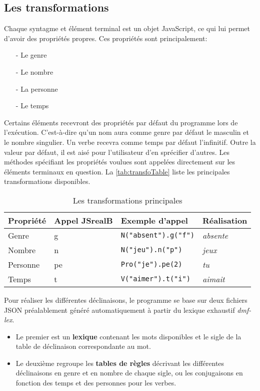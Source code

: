 \documentclass[11pt]{article} %
\newcommand{\system}[1]{\textsf{#1}}
\newcommand{\JSB}{\system{JSrealB}}
\newcommand{\real}[1]{\emph{#1}}
\begin{document}
\pagebreak{}
\subsection{Les transformations}

Chaque syntagme et élément terminal est un objet JavaScript, ce qui
lui permet d'avoir des propriétés propres. Ces propriétés sont principalement:
\begin{itemize}
\item[-] Le genre
\item[-] Le nombre
\item[-] La personne
\item[-] Le temps
\end{itemize}
Certains éléments recevront des propriétés par défaut du programme
lors de l'exécution. C'est-à-dire qu'un nom aura comme genre par défaut
le masculin et le nombre singulier. Un verbe recevra comme temps par
défaut l'infinitif. Outre la valeur par défaut, il est aisé pour
l'utilisateur d'en sprécifier d'autres. Les méthodes spécifiant les
propriétés voulues sont appelées directement sur les éléments terminaux
en question. La \autoref{tab:transfoTable} liste les principales transformations
disponibles.

\begin{table}[h]
\centering
\caption{Les transformations principales}
\label{tab:transfoTable}
\begin{tabular}{|l|l|l|l|}
\hline 
Propriété & Appel \JSB{} & Exemple d'appel & Réalisation\tabularnewline
\hline 
\hline 
Genre & g & \texttt{N("absent").g("f")} & \real{absente}\tabularnewline
\hline 
Nombre & n & \texttt{N("jeu").n("p")} & \real{jeux}\tabularnewline
\hline 
Personne & pe & \texttt{Pro("je").pe(2)} & \real{tu}\tabularnewline
\hline 
Temps & t & \texttt{V("aimer").t("i")} & \real{aimait}\tabularnewline
\hline 
\end{tabular}
\end{table}


Pour réaliser les différentes déclinaisons, le programme se base sur
deux fichiers JSON préalablement généré automatiquement à partir du 
lexique exhaustif \emph{dmf-lex}. 
\begin{itemize}
\item Le premier
est un \textbf{lexique} contenant les mots disponibles et le sigle de la table
de déclinaison correspondante au mot. 
\item Le deuxième regroupe les \textbf{tables
de règles} décrivant les différentes déclinaisons en genre et en nombre
de chaque sigle, ou les conjugaisons en fonction des temps et des
personnes pour les verbes.
\end{itemize}
\end{document}
